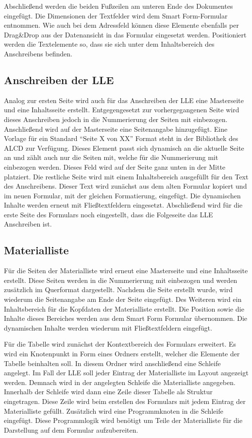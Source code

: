 Abschließend werden die beiden Fußzeilen am unteren Ende des Dokumentes eingefügt. Die Dimensionen der Textfelder wird dem Smart Form-Formular entnommen. Wie auch bei dem Adressfeld können diese Elemente ebenfalls per Drag\&Drop aus der Datenansicht in das Formular eingesetzt werden. Positioniert werden die Textelemente so, dass sie sich unter dem Inhaltsbereich des Anschreibens befinden.


\subsection{Anschreiben der \acs{LLE}}
	
Analog zur ersten Seite wird auch für das Anschreiben der \ac{LLE} eine Masterseite und eine Inhaltsseite erstellt. Entgegengesetzt zur vorhergegangenen Seite wird dieses Anschreiben jedoch in die Nummerierung der Seiten mit einbezogen. Anschließend wird auf der Masterseite eine Seitenangabe hinzugefügt. Eine Vorlage für ein Standard "`Seite X von XX"' Format steht in der Bibliothek des \ac{ALCD} zur Verfügung. Dieses Element passt sich dynamisch an die aktuelle Seite an und zählt auch nur die Seiten mit, welche für die Nummerierung mit einbezogen werden. Dieses Feld wird auf der Seite ganz unten in der Mitte platziert.
Die restliche Seite wird mit einem Inhaltsbereich ausgefüllt für den Text des Anschreibens. Dieser Text wird zunächst aus dem alten Formular kopiert und im neuen Formular, mit der gleichen Formatierung, eingefügt. Die dynamischen Inhalte werden erneut mit Fließtextfeldern eingesetzt. Abschließend wird für die erste Seite des Formulars noch eingestellt, dass die Folgeseite das \ac{LLE} Anschreiben ist. 
	
	
	\FloatBarrier
\subsection{Materialliste}

Für die Seiten der Materialliste wird erneut eine Masterseite und eine Inhaltsseite erstellt. Diese Seiten werden in die Nummerierung mit einbezogen und werden zusätzlich im Querformat dargestellt. Nachdem die Seite erstellt wurde, wird wiederum die Seitenangabe am Ende der Seite eingefügt. Des Weiteren wird ein Inhaltsbereich für die Kopfdaten der Materialliste erstellt. Die Position sowie die Inhalte dieses Bereiches werden aus dem Smart Form Formular übernommen. Die dynamischen Inhalte werden wiederum mit Fließtextfeldern eingefügt. 

Für die Tabelle wird zunächst der Kontextbereich des Formulars erweitert. Es wird ein Knotenpunkt in Form eines Ordners erstellt, welcher die Elemente der Tabelle beinhalten soll. In diesem Ordner wird anschließend eine Schleife angelegt. Im Fall der \ac{LLE} soll jeder Eintrag der Materialliste im Layout angezeigt werden. Demnach wird in der angelegten Schleife die Materialliste angegeben. Innerhalb der Schleife wird dann eine Zeile dieser Tabelle als Struktur eingetragen. Diese Zeile wird beim erstellen des Formulars mit jedem Eintrag der Materialliste gefüllt. Zusätzlich wird eine Programmknoten in die Schleife eingefügt. Diese Programmlogik wird benötigt um Teile der Materialliste für die Darstellung auf dem Formular aufzubereiten.

